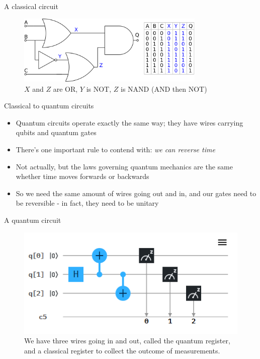 \documentclass[aspectratio=169, handout]{beamer}
\begin{document}
\begin{frame}{A classical circuit}
  \begin{figure}
      \centering
      \includegraphics[width=0.8\textwidth]{combologiccirc.png}
      \caption{$X$ and $Z$ are OR, $Y$ is NOT, $Z$ is NAND (AND then NOT)}
  \end{figure}
\end{frame}

\begin{frame}{Classical to quantum circuits}
    \begin{itemize}
        \item Quantum circuits operate exactly the same way; they have wires carrying qubits and quantum gates \pause
        \item There's one important rule to contend with: \textit{we can reverse time} \pause
        \item Not actually, but the laws governing quantum mechanics are the same whether time moves forwards or backwards \pause
        \item So we need the same amount of wires going out and in, and our gates need to be reversible - in fact, they need to be \textcolor{sigma@mainblue}{unitary}
    \end{itemize}
\end{frame}

\begin{frame}{A quantum circuit}
    \begin{figure}
            \centering
            \includegraphics[width=0.8\linewidth]{Am6Sg.png}
            \caption{We have three wires going in and out, called the \textcolor{sigma@mainblue}{quantum register,} and a \textcolor{sigma@mainblue}{classical register} to collect the outcome of measurements.}
        \end{figure}
\end{frame}
\end{document}
